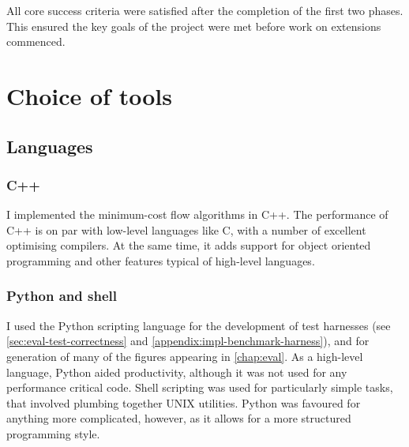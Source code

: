 All core success criteria were satisfied after the completion of the first two phases. This ensured the key goals of the project were met before work on extensions commenced. 

%

\section{Choice of tools}

\subsection{Languages} 

\subsubsection{C++}
I implemented the minimum-cost flow algorithms in C++. The performance of C++ is on par with low-level languages like C, with a number of excellent optimising compilers\footnotemark. At the same time, it adds support for object oriented programming and other features typical of high-level languages.

\subsubsection{Python and shell}
I used the Python scripting language for the development of test harnesses (see \cref{sec:eval-test-correctness} and \cref{appendix:impl-benchmark-harness}), and for generation of many of the figures appearing in \cref{chap:eval}. As a high-level language, Python aided productivity, although it was not used for any performance critical code. Shell scripting was used for particularly simple tasks, that involved plumbing together UNIX utilities. Python was favoured for anything more complicated, however, as it allows for a more structured programming style.

